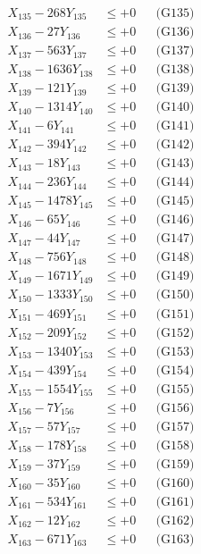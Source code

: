\documentclass[a4paper,10pt]{article}
\begin{document}
{\begin{align}
X_{135} - 268Y_{135} &\leq +0 && \text{(G135)} \\
X_{136} - 27Y_{136} &\leq +0 && \text{(G136)} \\
X_{137} - 563Y_{137} &\leq +0 && \text{(G137)} \\
X_{138} - 1636Y_{138} &\leq +0 && \text{(G138)} \\
X_{139} - 121Y_{139} &\leq +0 && \text{(G139)} \\
X_{140} - 1314Y_{140} &\leq +0 && \text{(G140)} \\
\allowbreak
X_{141} - 6Y_{141} &\leq +0 && \text{(G141)} \\
X_{142} - 394Y_{142} &\leq +0 && \text{(G142)} \\
X_{143} - 18Y_{143} &\leq +0 && \text{(G143)} \\
X_{144} - 236Y_{144} &\leq +0 && \text{(G144)} \\
X_{145} - 1478Y_{145} &\leq +0 && \text{(G145)} \\
X_{146} - 65Y_{146} &\leq +0 && \text{(G146)} \\
X_{147} - 44Y_{147} &\leq +0 && \text{(G147)} \\
X_{148} - 756Y_{148} &\leq +0 && \text{(G148)} \\
X_{149} - 1671Y_{149} &\leq +0 && \text{(G149)} \\
X_{150} - 1333Y_{150} &\leq +0 && \text{(G150)} \\
\allowbreak
X_{151} - 469Y_{151} &\leq +0 && \text{(G151)} \\
X_{152} - 209Y_{152} &\leq +0 && \text{(G152)} \\
X_{153} - 1340Y_{153} &\leq +0 && \text{(G153)} \\
X_{154} - 439Y_{154} &\leq +0 && \text{(G154)} \\
X_{155} - 1554Y_{155} &\leq +0 && \text{(G155)} \\
X_{156} - 7Y_{156} &\leq +0 && \text{(G156)} \\
X_{157} - 57Y_{157} &\leq +0 && \text{(G157)} \\
X_{158} - 178Y_{158} &\leq +0 && \text{(G158)} \\
X_{159} - 37Y_{159} &\leq +0 && \text{(G159)} \\
X_{160} - 35Y_{160} &\leq +0 && \text{(G160)} \\
\allowbreak
X_{161} - 534Y_{161} &\leq +0 && \text{(G161)} \\
X_{162} - 12Y_{162} &\leq +0 && \text{(G162)} \\
X_{163} - 671Y_{163} &\leq +0 && \text{(G163)} \\

\end{align}}
\end{document}
